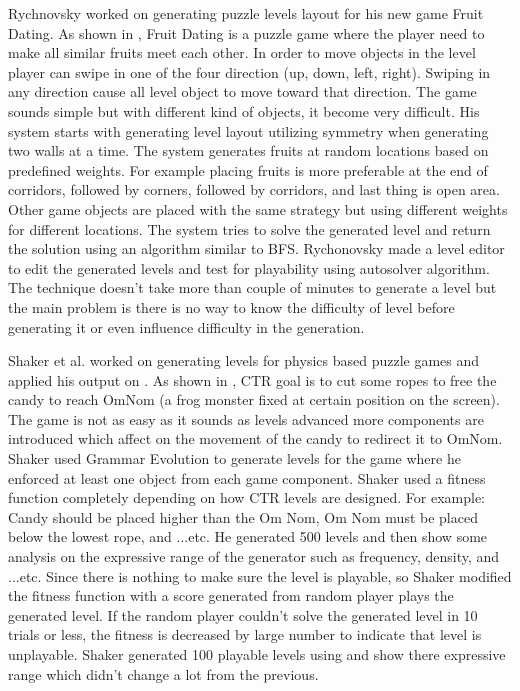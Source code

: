 Rychnovsky\cite{fruitDating} worked on generating puzzle levels layout for his new game Fruit Dating. As shown in , Fruit Dating is a puzzle game where the player need to make all similar fruits meet each other. In order to move objects in the level player can swipe in one of the four direction (up, down, left, right). Swiping in any direction cause all level object to move toward that direction. The game sounds simple but with different kind of objects, it become very difficult. His system starts with generating level layout utilizing symmetry when generating two walls at a time. The system generates fruits at random locations based on predefined weights. For example placing fruits is more preferable at the end of corridors, followed by corners, followed by corridors, and last thing is open area. Other game objects are placed with the same strategy but using different weights for different locations. The system tries to solve the generated level and return the solution using an algorithm similar to BFS. Rychonovsky made a level editor to edit the generated levels and test for playability using autosolver algorithm. The technique doesn't take more than couple of minutes to generate a level but the main problem is there is no way to know the difficulty of level before generating it or even influence difficulty in the generation.


Shaker et al.\cite{ctrAutomaticGeneration} worked on generating levels for physics based puzzle games and applied his output on . As shown in , CTR goal is to cut some ropes to free the candy to reach OmNom (a frog monster fixed at certain position on the screen). The game is not as easy as it sounds as levels advanced more components are introduced which affect on the movement of the candy to redirect it to OmNom. Shaker used Grammar Evolution to generate levels for the game where he enforced at least one object from each game component. Shaker used a fitness function completely depending on how CTR levels are designed. For example: Candy should be placed higher than the Om Nom, Om Nom must be placed below the lowest rope, and ...etc. He generated 500 levels and then show some analysis on the expressive range of the generator such as frequency, density, and ...etc. Since there is nothing to make sure the level is playable, so Shaker modified the fitness function with a score generated from random player plays the generated level. If the random player couldn't solve the generated level in 10 trials or less, the fitness is decreased by large number to indicate that level is unplayable. Shaker generated 100 playable levels using and show there expressive range which didn't change a lot from the previous.\\\par

